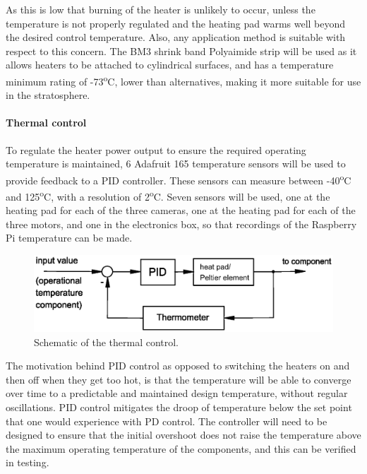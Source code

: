 As this is low that burning of the heater is unlikely to occur, unless the temperature is not properly regulated and the heating pad warms well beyond the desired control temperature. Also, any application method is suitable with respect to this concern. The BM3 shrink band Polyaimide strip will be used as it allows heaters to be attached to cylindrical surfaces, and has a temperature minimum rating of -73\textsuperscript{o}C, lower than alternatives, making it more suitable for use in the stratosphere. \\

\paragraph{Thermal control}

To regulate the heater power output to ensure the required operating temperature is maintained, 6 Adafruit 165 temperature sensors will be used to provide feedback to a PID controller. These sensors can measure between -40\textsuperscript{o}C and 125\textsuperscript{o}C, with a resolution of 2\textsuperscript{o}C. Seven sensors will be used, one at the heating pad for each of the three cameras, one at the heating pad for each of the three motors, and one in the electronics box, so that recordings of the Raspberry Pi temperature can be made. %

	\begin{figure}[h!]
    \centering
    \includegraphics[scale=0.6]{4-experiment-design/img/mechanical/Thermal_control.eps}
	\caption{Schematic of the thermal control.}
	\label{fig:Thermal_control}
	\end{figure}

The motivation behind PID control as opposed to switching the heaters on and then off when they get too hot, is that the temperature will be able to converge over time to a predictable and maintained design temperature, without regular oscillations. PID control mitigates the droop of temperature below the set point that one would experience with PD control. The controller will need to be designed to ensure that the initial overshoot does not raise the temperature above the maximum operating temperature of the components, and this can be verified in testing.

